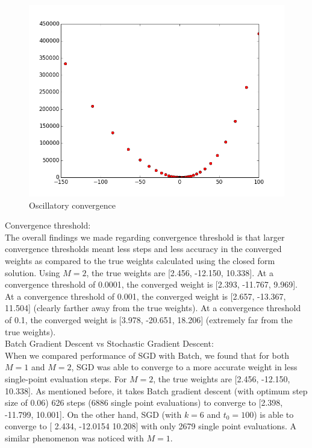 \documentclass{article}
\begin{document}
\begin{figure}[width=\linewidth]
\centering
\includegraphics[width=1.2\linewidth]{code/P2/oscillation.png}
\caption{Oscillatory convergence}
\end{figure}

Convergence threshold:\\
The overall findings we made regarding convergence threshold is that larger convergence thresholds meant less steps and less accuracy in the converged weights as compared to the true weights calculated using the closed form solution. Using $M = 2$, the true weights are [2.456, -12.150, 10.338]. At a convergence threshold of 0.0001, the converged weight is [2.393, -11.767, 9.969]. At a convergence threshold of 0.001, the converged weight is [2.657, -13.367, 11.504] (clearly farther away from the true weights). At a convergence threshold of 0.1, the converged weight is [3.978, -20.651, 18.206] (extremely far from the true weights).\\

Batch Gradient Descent vs Stochastic Gradient Descent: \\

When we compared performance of SGD with Batch, we found that for both $M = 1$ and $M = 2$, SGD was able to converge to a more accurate weight in less single-point evaluation steps. For $M = 2$, the true weights are [2.456, -12.150, 10.338]. As mentioned before, it takes Batch gradient descent (with optimum step size of 0.06) 626 steps (6886 single point evaluations) to converge to [2.398, -11.799, 10.001]. On the other hand, SGD (with $k = 6$ and $t_{0} = 100$) is able to converge to [ 2.434, -12.0154  10.208] with only 2679 single point evaluations. A similar phenomenon was noticed with $M = 1$. 
\end{document}
